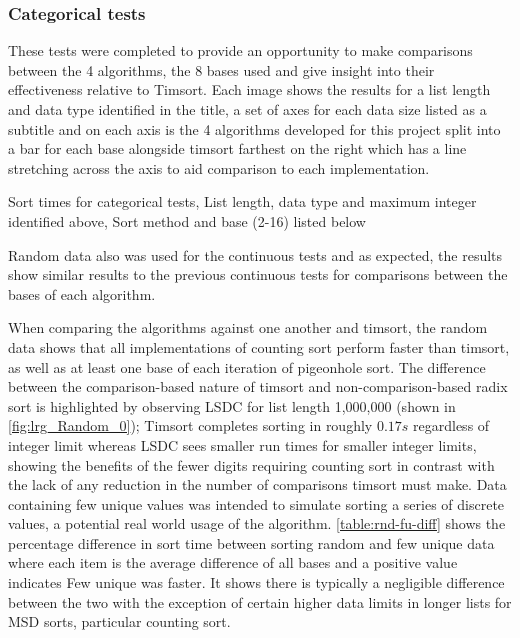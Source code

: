 \documentclass[12pt]{article}
\begin{document}
	\subsubsection{Categorical tests}
	\label{sssec:cattests}
	These tests were completed to provide an opportunity to make comparisons between the 4 algorithms, the 8 bases used and give insight into their effectiveness relative to Timsort. Each image shows the results for a list length and data type identified in the title, a set of axes for each data size listed as a subtitle and on each axis is the 4 algorithms developed for this project split into a bar for each base alongside timsort farthest on the right which has a line stretching across the axis to aid comparison to each implementation.
	\begin{table}[b]
		\centering
		\captionsetup{type=figure}
			\vspace{-0.5cm}
			\caption{Sort times for categorical tests, List length, data type and maximum integer identified above, Sort method and base (2-16) listed below\label{fig:lrg_Random_0}}
			

			
	\end{table}
	Random data also was used for the continuous tests and as expected, the results show similar results to the previous continuous tests for comparisons between the bases of each algorithm. 
	\par
	When comparing the algorithms against one another and timsort, the random data shows that all implementations of counting sort perform faster than timsort, as well as at least one base of each iteration of pigeonhole sort. The difference between the comparison-based nature of timsort and non-comparison-based radix sort is highlighted by observing LSD\textunderscore C for list length 1,000,000 (shown in \autoref{fig:lrg_Random_0}); Timsort completes sorting in roughly $0.17s$ regardless of integer limit whereas LSD\textunderscore C sees smaller run times for smaller integer limits, showing the benefits of the fewer digits requiring counting sort in contrast with the lack of any reduction in the number of comparisons timsort must make.
	\pagebreak
	Data containing few unique values was intended to simulate sorting a series of discrete values, a potential real world usage of the algorithm. \autoref{table:rnd-fu-diff} shows the percentage difference in sort time between sorting random and few unique data where each item is the average difference of all bases and a positive value indicates Few unique was faster. It shows there is typically a negligible difference between the two with the exception of certain higher data limits in longer lists for MSD sorts, particular counting sort. 
\end{document}
